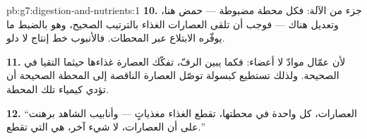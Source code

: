 \begin{solution}{pb:g7:digestion-and-nutrients:1}
\textbf{10.}  جزء من الآلة: فكل محطة مضبوطة --- حمض هنا،
وتعديل هناك --- فوجب أن تلقى العصارات الغذاء بالترتيب الصحيح، وهو
بالضبط ما يوفّره الابتلاع عبر المحطات. فالأنبوب خط إنتاج لا دلو.

\textbf{11.} لأن عمّال  موادّ لا أعضاء: فكما يبين الرفّ،
تفكّك العصارة غذاءها حيثما التقيا في  الصحيحة. ولذلك تستطيع
كبسولة توصّل العصارة الناقصة إلى المحطة الصحيحة أن تؤدي كيمياء تلك
المحطة.

\textbf{12.} ``العصارات، كل واحدة في محطتها، تقطع الغذاء مغذياتٍ
--- وأنابيب الشاهد برهنت على أن العصارات، لا شيء آخر، هي التي تقطع.''
\end{solution}

